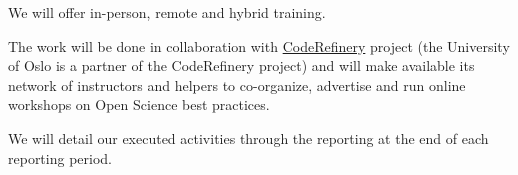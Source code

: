 \begin{task}[
  title=Training Workshops for more reproducible science,
  id=workshops,
  lead=UIO,
  PM=9,
  partners={SRL,MP,IFR}
]
\begin{compactitem}
   \item We will offer in-person, remote and hybrid training.

   \item The work will be done in collaboration with
     \href{https://coderefinery.org}{CodeRefinery} project (the University of Oslo is a partner of the CodeRefinery project) 
     and will make available its network of instructors and helpers
     to co-organize, advertise and run online workshops on Open Science best practices. 

  \item We will detail our executed activities through the reporting at the end of
    each reporting period.
  \end{compactitem}
\end{task}
